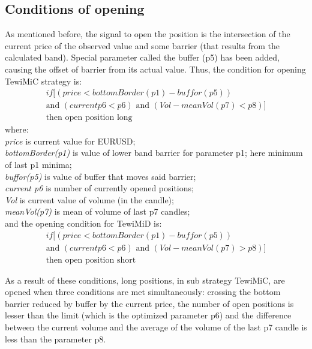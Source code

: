 \documentclass{tewiart}
\begin{document}
\subsection{Conditions of opening}
As mentioned before, the signal to open the position is the intersection of the current price of the observed value and some barrier (that results from the calculated band). Special parameter called the buffer (p5) has been added, causing the offset of barrier from its actual value. Thus, the condition for opening TewiMiC strategy is: 
\begin{equation}
\begin{split}
if[(price < bottomBorder(p1) - buffor(p5)) \\ 
\text{and } (current p6 < p6) \text{ and } (Vol - meanVol(p7) < p8)] \\
\text{then open position long}
\end{split}
\end{equation}
where:\\
\textit{price} is current value for EURUSD;\\
\textit{bottomBorder(p1)} is value of lower band barrier for parameter p1; here minimum of last p1 minima; \\
\textit{buffor(p5)} is value of buffer that moves said barrier;\\
\textit{current p6} is number of currently opened positions;\\
\textit{Vol} is current value of volume (in the candle);\\
\textit{meanVol(p7)} is mean of volume of last p7 candles;\\

\noindent and the opening condition for TewiMiD is:
\begin{equation}
\begin{split}
if[(price < bottomBorder(p1) - buffor(p5)) \\ 
\text{and } (current p6 < p6) \text{ and } (Vol - meanVol(p7) > p8)] \\
\text{then open position short}
\end{split}
\end{equation}

As a result of these conditions, long positions, in sub strategy TewiMiC, are opened when three conditions are met simultaneously: crossing the bottom barrier reduced by buffer by the current price, the number of open positions is lesser than the limit (which is the optimized parameter p6) and the difference between the current volume and the average of the volume of the last p7 candle is less than the parameter p8.\\
\end{document}

